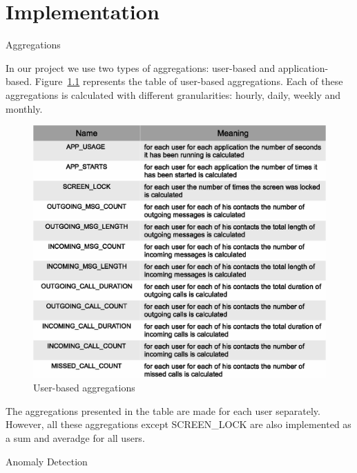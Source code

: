 \chapter{Implementation}
\label{chap:implementation}



Aggregations

In our project we use two types of aggregations: user-based and application-based.
Figure~\ref{fig:user_based_aggregations} represents the table of user-based aggregations.
Each of these aggregations is calculated with different granularities: hourly, daily, weekly and monthly.

\begin{figure}
  \centering
  \includegraphics [width=1.0\textwidth]{images/user_based_aggregations}
  \caption{User-based aggregations}
  \label{fig:user_based_aggregations}
\end{figure}

The aggregations presented in the table are made for each user separately.
However, all these aggregations except SCREEN\_LOCK are also implemented as a sum and averadge for all users. 



Anomaly Detection

